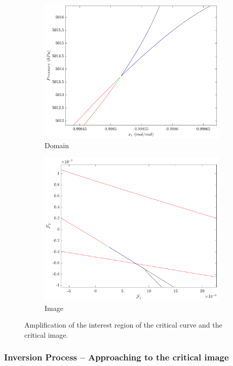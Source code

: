 \documentclass{article}
\theoremstyle{definition}
\theoremstyle{remark}
\begin{document}
\begin{figure}
\centering
\begin{subfigure}{.5\textwidth}
  \centering
  \includegraphics[width=.9\linewidth]{bicos_dominio}
  \caption{Domain}
  \label{fig:sub1}
\end{subfigure}%
\begin{subfigure}{.5\textwidth}
  \centering
  \includegraphics[width=.9\linewidth]{bicos_imagem}
  \caption{Image}
  \label{fig:sub2}
\end{subfigure}
\caption{Amplification of the interest region of the critical curve and the critical image.}
\label{fig:domain_image}
\end{figure}

\subsubsection{Inversion Process -- Approaching to the critical image}
\end{document}
